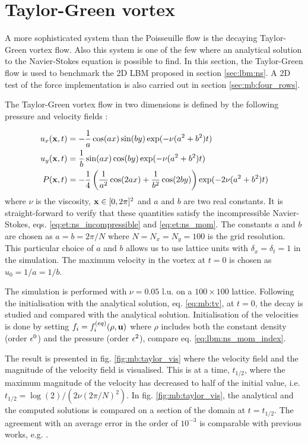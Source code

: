 \section{Taylor-Green vortex}
A more sophisticated system than the Poisseuille flow is the decaying
Taylor-Green vortex flow. Also this system is one of the few where an
analytical solution to the Navier-Stokes equation is possible to
find. In this section, the Taylor-Green flow is used to benchmark the
2D LBM proposed in section \ref{sec:lbm:ns}. A 2D test of the force
implementation is also carried out in section \ref{sec:mb:four_rows}.

The Taylor-Green vortex flow in two dimensions is defined by the
following pressure and velocity fields \cite{junk-asym}:

\begin{equation}\label{eq:mb:tv}
\begin{aligned}
u_x(\mathbf{x}, t) &= -\frac{1}{a}\cos(ax)\sin(by)\exp(-\nu(a^2 +
b^2)t)\\ 
u_y(\mathbf{x}, t) &= \frac{1}{b}\sin(ax)\cos(by)\exp(-\nu(a^2 +
b^2)t)\\ 
P(\mathbf{x}, t) &= -\frac{1}{4} \left( \frac{1}{a^2}\cos(2ax) +
\frac{1}{b^2}\cos(2by)\right) \exp(-2\nu(a^2 + b^2)t)
\end{aligned}
\end{equation}
where $\nu$ is the viscosity, $\mathbf{x}\in[0, 2\pi]^2$ and $a$ and $b$ are
two real constants. It is straight-forward to verify that these
quantities satisfy the incompressible Navier-Stokes,
eqs. \eqref{eq:et:ns_incompressible} and \eqref{eq:et:ns_mom}. The
constants $a$ and $b$ are chosen as $a = b = 2\pi/N$ where $N = N_x =
N_y = 100$ is the grid resolution. This particular choice of $a$ and
$b$ allows us to use lattice units with $\delta_x = \delta_t = 1$ in
the simulation. The maximum velocity in the vortex at $t = 0$ is chosen
as $u_0 = 1/a = 1/b$.

The simulation is performed with $\nu = 0.05$ l.u. on a $100\times100$
lattice. Following the initialisation with the analytical solution,
eq. \eqref{eq:mb:tv}, at $t = 0$, the decay is studied and compared
with the analytical solution. Initialisation of the velocities is done
by setting $f_i = f_i^{(eq)}(\rho, \mathbf{u})$ where $\rho$ includes both the
constant density (order $\epsilon^0$) and the pressure (order $\epsilon^2$),
compare eq. \eqref{eq:lbm:ns_mom_index}.

The result is presented in fig. \ref{fig:mb:taylor_vis} where the
velocity field and the magnitude of the velocity field is
visualised. This is at a time, $t_{1/2}$, where the maximum magnitude
of the velocity has decreased to half of the initial value,
i.e. $t_{1/2} = \log(2)/(2\nu(2\pi/N)^2)$. In
fig. \ref{fig:mb:taylor_vis}, the analytical and the computed
solutions is compared on a section of the domain at $t = t_{1/2}$. The
agreement with an average error in the order of $10^{-3}$ is
comparable with previous works, e.g. \cite{junk-asym}.


